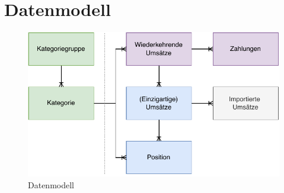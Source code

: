 \section{Datenmodell} 

\begin{figure}[ht!]
	\centering
	\includegraphics[width=.8\textwidth]{img/DataModel}
	\vspace{0em}
	\caption{Datenmodell}
	\label{fig:datamodel}
\end{figure}